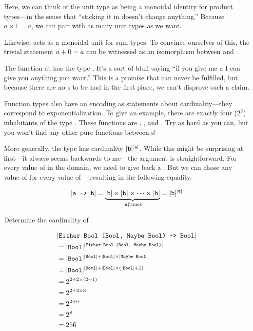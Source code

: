 \documentclass[book.tex]{subfiles}
\begin{document}

Here, we can think of the unit type as being a monoidal identity for product
types---in the sense that ``sticking it in doesn't change anything.'' Because $a
\times 1 = a$, we can pair with as many unit types as we want.

Likewise,  acts as a monoidal unit for sum types. To convince ourselves
of this, the trivial statement $a+0 = a$ can be witnessed as an isomorphism
between  and .


The function  at  has the type . It's a sort of
bluff saying ``if you give me a  I can give you anything you want.''
This is a promise that can never be fulfilled, but because there are no
s to be had in the first place, we can't disprove such a claim.

Function types also have an encoding as statements about cardinality---they
correspond to exponentialization. To give an example, there are exactly four
($2^2$) inhabitants of the type . These functions are ,
,  and . Try as hard as you can, but you
won't find any other pure functions between s!

More generally, the type  has cardinality $\lvert\texttt{b}\rvert^{\lvert\texttt{a}\rvert}$.
While this might be surprising at first---it always seems backwards to me---the
argument is straightforward. For every value of  in the domain, we need to
give back a . But we can chose any value of  for every value of
---resulting in the following equality.

$$
\lvert\texttt{a -> b}\rvert = \underbrace{\lvert\texttt{b}\rvert \times \lvert\texttt{b}\rvert \times \cdots \times
\lvert\texttt{b}\rvert}_{\lvert\texttt{a}\rvert \text{times}} = \lvert\texttt{b}\rvert^{\lvert\texttt{a}\rvert}
$$

\begin{exercise}
Determine the cardinality of .
\end{exercise}
\begin{solution}
$$
\begin{align*}
  &  \lvert\texttt{Either Bool (Bool, Maybe Bool) -> Bool}\rvert \\
  &= \lvert\texttt{Bool}\rvert^{\lvert\texttt{Either Bool (Bool, Maybe Bool)}\rvert} \\
  &= \lvert\texttt{Bool}\rvert^{\lvert\texttt{Bool}\rvert+\lvert\texttt{Bool}\rvert\times\lvert\texttt{Maybe Bool}\rvert} \\
  &= \lvert\texttt{Bool}\rvert^{\lvert\texttt{Bool}\rvert+\lvert\texttt{Bool}\rvert\times(\lvert\texttt{Bool}\rvert+1)} \\
  &= 2^{2+2\times(2+1)} \\
  &= 2^{2+2\times 3} \\
  &= 2^{2+6} \\
  &= 2^{8} \\
  &= 256
\end{align*}
$$
\end{solution}
\end{document}
